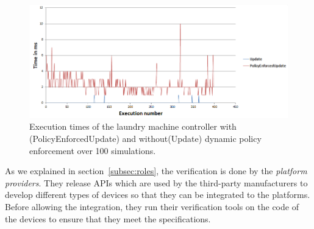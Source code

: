 \documentclass{article}
\begin{document}
\begin{figure}[htpb]
\begin{center}
\includegraphics[scale=0.35, trim = 0 1cm 0 1cm]{results_update.png}
\caption{Execution times of the laundry machine controller with (PolicyEnforcedUpdate) and without(Update) dynamic policy enforcement over 100 simulations.}
\label{fig:dynamic}
\end{center}
\end{figure}
As we explained in section~\ref{subsec:roles}, the verification is done by the \textit{platform providers}. They release APIs which are used by the third-party manufacturers to develop different types of devices so that they can be integrated to the platforms. Before allowing the integration, they run their verification tools on the code of the devices to ensure that they meet the specifications.
\end{document}
